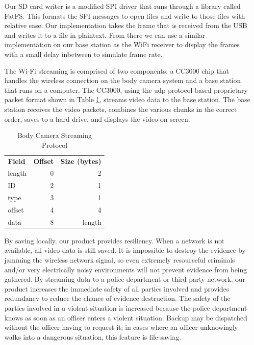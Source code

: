 \documentclass[12pt]{article}
\begin{document}
Our SD card writer is a modified SPI driver that runs through a library called
FatFS. This formats the SPI messages to open files and write to those files
with relative ease. Our implementation takes the frame that is received from
the USB and writes it to a file in plaintext. From there we can use a similar
implementation on our base station as the WiFi receiver to display the frames
with a small delay inbetween to simulate frame rate. 

The Wi-Fi streaming is comprised of two components: a CC3000 chip that handles
the wireless connection on the body camera system and a base station that runs
on a computer. The CC3000, using the \gls{udp} protocol-based proprietary
packet format shown in Table \ref{tab:packet_format}, streams video data to the
base station.  The base station receives the video packets, combines the
various chunks in the correct order, saves to a hard drive, and displays the
video on-screen.

\begin{table}[h]
    \centering
    \caption{Body Camera Streaming Protocol}
    \vspace{1.0em}
    \begin{tabular}{lrr}
        \textbf{Field} & \textbf{Offset} & \textbf{Size (bytes)}\\
        length & 0 & 2\\
        ID & 2 & 1\\
        type & 3 & 1\\
        offset & 4 & 4\\
        data & 8 & length\\
    \end{tabular}
    \label{tab:packet_format}
\end{table}

By saving locally, our product provides resiliency. When a network is not
available, all video data is still saved. It is impossible to destroy the
evidence by jamming the wireless network signal, so even extremely resourceful
criminals and/or very electrically noisy environments will not prevent evidence
from being gathered. By streaming data to a police department or third party
network, our product increases the immediate safety of all parties involved and
provides redundancy to reduce the chance of evidence destruction. The safety of
the parties involved in a violent situation is increased because the police
department knows as soon as an officer enters a violent situation. Backup may
be dispatched without the officer having to request it; in cases where an
officer unknowingly walks into a dangerous situation, this feature is
life-saving.
\end{document}
